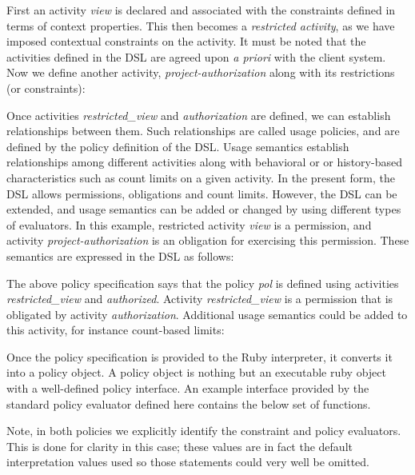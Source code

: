 First an activity {\em view} is declared and associated with the constraints defined in terms of context properties.  This then becomes a {\em restricted activity}, as we have imposed contextual constraints on the activity.  It must be noted that the activities defined in the DSL are agreed upon {\em a priori} with the client system.  Now we define another activity, {\em project-authorization} along with its restrictions (or constraints):

\vfill\eject


Once activities {\em restricted\_view} and {\em authorization} are defined, we can establish relationships between them. Such relationships are called usage policies, and are defined by the policy definition of the DSL. Usage semantics establish relationships among different activities along with behavioral or or history-based characteristics such as count limits on a given activity. In the present form, the DSL allows permissions, obligations and count limits. However, the DSL can be extended, and usage semantics can be added or changed by using different types of evaluators. In this example, restricted activity {\em view} is a permission, and activity {\em project-authorization} is an obligation for exercising this permission. These semantics are expressed in the DSL as follows: 



The above policy specification says that the policy {\em pol} is defined using activities {\em restricted\_view} and {\em authorized}.  Activity {\em restricted\_view} is a permission that is obligated by activity {\em authorization}.  Additional usage semantics could be added to this activity, for instance count-based limits:



Once the policy specification is provided to the Ruby interpreter, it converts it into a policy object. A policy object is nothing but an executable ruby object with a well-defined policy interface. An example interface provided by the standard policy evaluator defined here contains the below set of functions.

Note, in both policies we explicitly identify the constraint and policy evaluators.  This is done for clarity in this case; these values are in fact the default interpretation values used so those statements could very well be omitted.

